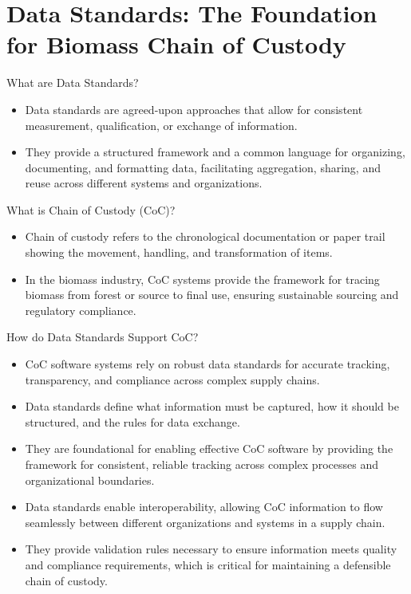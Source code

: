 \documentclass[presentation]{beamer}
\begin{document}
\section{Data Standards: The Foundation for Biomass Chain of Custody}
\label{data-standards-the-foundation-for-biomass-chain-of-custody}
\begin{frame}[label={sec:org691ac29}]{What are Data Standards?}
\begin{itemize}
\item Data standards are agreed-upon approaches that allow for consistent measurement, qualification, or exchange of information.
\item They provide a structured framework and a common language for organizing, documenting, and formatting data, facilitating aggregation, sharing, and reuse across different systems and organizations.
\end{itemize}
\end{frame}
\begin{frame}[label={sec:org1ad1c18}]{What is Chain of Custody (CoC)?}
\begin{itemize}
\item Chain of custody refers to the chronological documentation or paper trail showing the movement, handling, and transformation of items.
\item In the biomass industry, CoC systems provide the framework for tracing biomass from forest or source to final use, ensuring sustainable sourcing and regulatory compliance.
\end{itemize}
\end{frame}
\begin{frame}[label={sec:orgbdb12f2}]{How do Data Standards Support CoC?}
\begin{itemize}
\item CoC software systems rely on robust data standards for accurate tracking, transparency, and compliance across complex supply chains.
\item Data standards define what information must be captured, how it should be structured, and the rules for data exchange.
\item They are foundational for enabling effective CoC software by providing the framework for consistent, reliable tracking across complex processes and organizational boundaries.
\item Data standards enable interoperability, allowing CoC information to flow seamlessly between different organizations and systems in a supply chain.
\item They provide validation rules necessary to ensure information meets quality and compliance requirements, which is critical for maintaining a defensible chain of custody.
\end{itemize}
\end{frame}
\end{document}
